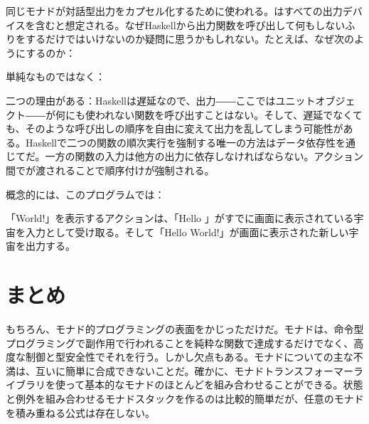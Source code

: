 同じモナドが対話型出力をカプセル化するために使われる。はすべての出力デバイスを含むと想定される。なぜHaskellから出力関数を呼び出して何もしないふりをするだけではいけないのか疑問に思うかもしれない。たとえば、なぜ次のようにするのか：

単純なものではなく：

二つの理由がある：Haskellは遅延なので、出力――ここではユニットオブジェクト――が何にも使われない関数を呼び出すことはない。そして、遅延でなくても、そのような呼び出しの順序を自由に変えて出力を乱してしまう可能性がある。Haskellで二つの関数の順次実行を強制する唯一の方法はデータ依存性を通じてだ。一方の関数の入力は他方の出力に依存しなければならない。アクション間でが渡されることで順序付けが強制される。

概念的には、このプログラムでは：

「World!」を表示するアクションは、「Hello 」がすでに画面に表示されている宇宙を入力として受け取る。そして「Hello World!」が画面に表示された新しい宇宙を出力する。

\section{まとめ}

もちろん、モナド的プログラミングの表面をかじっただけだ。モナドは、命令型プログラミングで副作用で行われることを純粋な関数で達成するだけでなく、高度な制御と型安全性でそれを行う。しかし欠点もある。モナドについての主な不満は、互いに簡単に合成できないことだ。確かに、モナドトランスフォーマーライブラリを使って基本的なモナドのほとんどを組み合わせることができる。状態と例外を組み合わせるモナドスタックを作るのは比較的簡単だが、任意のモナドを積み重ねる公式は存在しない。
